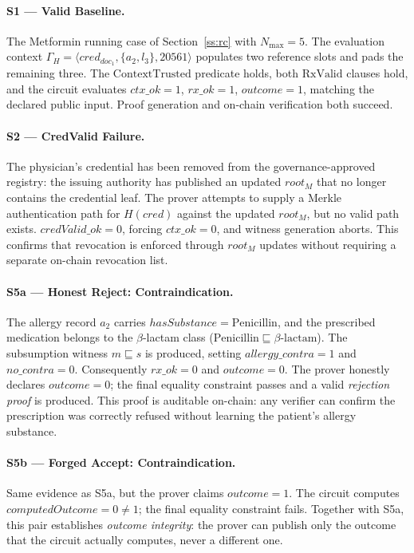 \documentclass[journal]{IEEEtran}
\begin{document}
\paragraph{S1 --- Valid Baseline.}
The Metformin running case of Section~\ref{ss:rc}
with $N_{\max} = 5$. The evaluation context
$\Gamma_H = \langle \mathit{cred}_{\mathit{doc}_1}, \{a_2, l_3\},
20561 \rangle$ populates two reference slots and pads the
remaining three. The $\mathrm{ContextTrusted}$ predicate holds,
both $\mathrm{RxValid}$ clauses hold, and the circuit evaluates
$\mathit{ctx\_ok} = 1$, $\mathit{rx\_ok} = 1$, 
$\mathit{outcome} = 1$, matching the declared public input.
Proof generation and on-chain verification both succeed.

\paragraph{S2 --- CredValid Failure.}
The physician's credential has been removed from the
governance-approved registry: the issuing authority has
published an updated $\mathit{root}_M$ that no longer
contains the credential leaf. The prover attempts to supply
a Merkle authentication path for $H(\mathit{cred})$ against
the updated $\mathit{root}_M$, but no valid path exists.
$\mathit{credValid\_ok} = 0$, forcing $\mathit{ctx\_ok} = 0$,
and witness generation aborts. This confirms that revocation
is enforced through $\mathit{root}_M$ updates without
requiring a separate on-chain revocation list.

\paragraph{S5a --- Honest Reject: Contraindication.}
The allergy record $a_2$ carries
$\mathit{hasSubstance} = \mathrm{Penicillin}$, and the prescribed
medication belongs to the $\beta$-lactam class
($\mathrm{Penicillin} \sqsubseteq \beta\text{-lactam}$). The
subsumption witness $m \sqsubseteq s$ is produced, setting
$\mathit{allergy\_contra} = 1$ and
$\mathit{no\_contra} = 0$. Consequently $\mathit{rx\_ok} = 0$ and
$\mathit{outcome} = 0$. The prover honestly declares
$\mathit{outcome} = 0$; the final equality constraint passes and a
valid \emph{rejection proof} is produced. This proof is auditable
on-chain: any verifier can confirm the prescription was correctly
refused without learning the patient's allergy substance.

\paragraph{S5b --- Forged Accept: Contraindication.}
Same evidence as S5a, but the prover claims
$\mathit{outcome} = 1$. The circuit computes
$\mathit{computedOutcome} = 0 \neq 1$; the final equality constraint
fails. Together with S5a, this pair establishes
\emph{outcome integrity}: the prover can publish only the outcome
that the circuit actually computes, never a different one.
\end{document}
